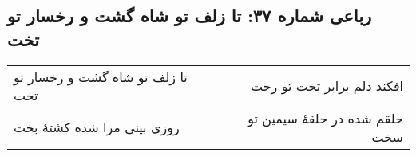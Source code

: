 \begin{center}
\section*{رباعی شماره ۳۷: تا زلف تو شاه گشت و رخسار تو تخت}
\label{sec:sh037}
\begin{longtable}{l p{0.5cm} r}
تا زلف تو شاه گشت و رخسار تو تخت
&&
افکند دلم برابر تخت تو رخت
\\
روزی بینی مرا شده کشتهٔ بخت
&&
حلقم شده در حلقهٔ سیمین تو سخت
\\
\end{longtable}
\end{center}
